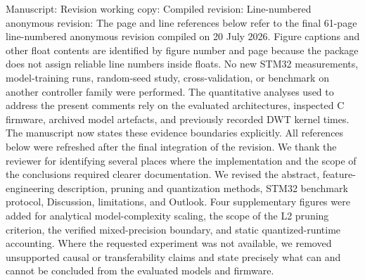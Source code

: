 \markdownRendererDocumentBegin
\markdownRendererSectionBegin
{}\markdownRendererInterblockSeparator
{}Manuscript: \markdownRendererParagraphSeparator
{}Revision working copy: \markdownRendererParagraphSeparator
{}Compiled revision: \markdownRendererParagraphSeparator
{}Line-numbered anonymous revision: \markdownRendererParagraphSeparator
{}The page and line references below refer to the final 61-page line-numbered anonymous revision compiled on 20 July 2026. Figure captions and other float contents are identified by figure number and page because the  package does not assign reliable line numbers inside floats. No new STM32 measurements, model-training runs, random-seed study, cross-validation, or benchmark on another controller family were performed. The quantitative analyses used to address the present comments rely on the evaluated architectures, inspected C firmware, archived model artefacts, and previously recorded DWT kernel times. The manuscript now states these evidence boundaries explicitly. All references below were refreshed after the final integration of the revision.\markdownRendererInterblockSeparator
{}\markdownRendererSectionBegin
{}\markdownRendererInterblockSeparator
{}We thank the reviewer for identifying several places where the implementation and the scope of the conclusions required clearer documentation. We revised the abstract, feature-engineering description, pruning and quantization methods, STM32 benchmark protocol, Discussion, limitations, and Outlook. Four supplementary figures were added for analytical model-complexity scaling, the scope of the L2 pruning criterion, the verified mixed-precision boundary, and static quantized-runtime accounting. Where the requested experiment was not available, we removed unsupported causal or transferability claims and state precisely what can and cannot be concluded from the evaluated models and firmware.\markdownRendererInterblockSeparator
